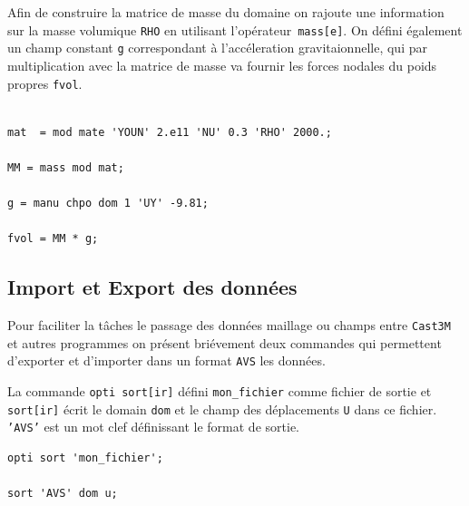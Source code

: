 \begin{castemcom}
Afin de construire la matrice de masse du domaine on rajoute une 
information sur la masse volumique \texttt{RHO} en 
utilisant l'opérateur~\texttt{mass[e]}. On défini également un champ
constant \texttt{g} correspondant à l'accéleration gravitaionnelle,
qui par multiplication avec la matrice de masse va fournir les forces
nodales du poids propres \texttt{fvol}.   

\end{castemcom}
\begin{castemlines}
\begin{verbatim}

mat  = mod mate 'YOUN' 2.e11 'NU' 0.3 'RHO' 2000.; 

MM = mass mod mat; 

g = manu chpo dom 1 'UY' -9.81; 

fvol = MM * g;

\end{verbatim}
\end{castemlines}


\subsection*{Import et Export des données}

Pour faciliter la tâches le passage des données maillage ou champs entre 
\texttt{Cast3M} et autres programmes on présent briévement deux commandes 
qui permettent d'exporter et d'importer dans un format \texttt{AVS} les données.
 
\begin{castemcom}
La commande \texttt{opti sort[ir]} défini \texttt{mon\_fichier}
comme fichier de sortie et \texttt{sort[ir]} écrit le domain 
\texttt{dom} et le champ des déplacements \texttt{U} dans 
ce fichier. \texttt{'AVS'} est un mot clef définissant le format 
de sortie.  
\end{castemcom}
\begin{castemlines}
\begin{verbatim}
opti sort 'mon_fichier';

sort 'AVS' dom u; 
  
\end{verbatim}
\end{castemlines}

